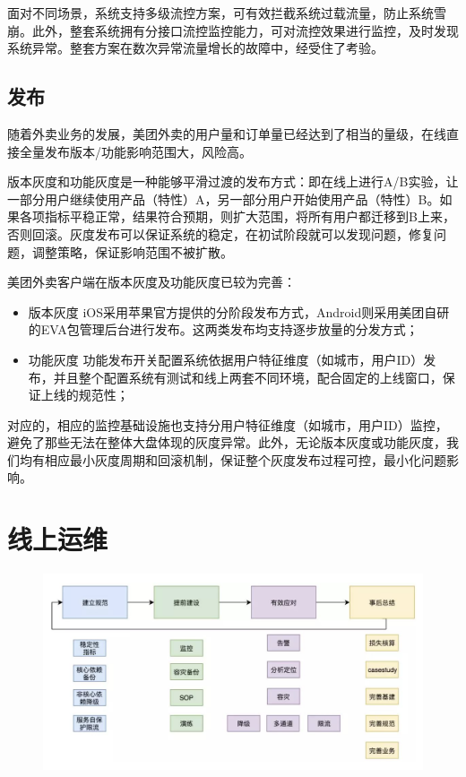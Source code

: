 \documentclass[12pt]{article}
\begin{document}
面对不同场景，系统支持多级流控方案，可有效拦截系统过载流量，防止系统雪崩。此外，整套系统拥有分接口流控监控能力，可对流控效果进行监控，及时发现系统异常。整套方案在数次异常流量增长的故障中，经受住了考验。

\subsection{发布}
随着外卖业务的发展，美团外卖的用户量和订单量已经达到了相当的量级，在线直接全量发布版本/功能影响范围大，风险高。

版本灰度和功能灰度是一种能够平滑过渡的发布方式：即在线上进行A/B实验，让一部分用户继续使用产品（特性）A，另一部分用户开始使用产品（特性）B。如果各项指标平稳正常，结果符合预期，则扩大范围，将所有用户都迁移到B上来，否则回滚。灰度发布可以保证系统的稳定，在初试阶段就可以发现问题，修复问题，调整策略，保证影响范围不被扩散。

美团外卖客户端在版本灰度及功能灰度已较为完善：
\begin{itemize}
\setlength{\itemsep}{0pt}
\setlength{\parsep}{0pt}
\setlength{\parskip}{0pt}
    \item 版本灰度 iOS采用苹果官方提供的分阶段发布方式，Android则采用美团自研的EVA包管理后台进行发布。这两类发布均支持逐步放量的分发方式；
    \item 功能灰度 功能发布开关配置系统依据用户特征维度（如城市，用户ID）发布，并且整个配置系统有测试和线上两套不同环境，配合固定的上线窗口，保证上线的规范性；
\end{itemize}

对应的，相应的监控基础设施也支持分用户特征维度（如城市，用户ID）监控，避免了那些无法在整体大盘体现的灰度异常。此外，无论版本灰度或功能灰度，我们均有相应最小灰度周期和回滚机制，保证整个灰度发布过程可控，最小化问题影响。

\section{线上运维}
\begin{figure}[H]
    \centering
    \includegraphics[width=1\textwidth]{fig/Meituan_APP_High_10.png}
\end{figure}
\end{document}
